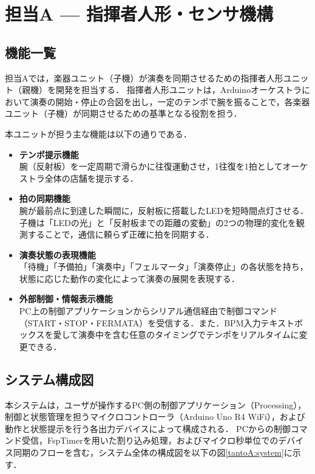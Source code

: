 \section{担当A — 指揮者人形・センサ機構}

\subsection{機能一覧}
担当Aでは，楽器ユニット（子機）が演奏を同期させるための指揮者人形ユニット（親機）を開発を担当する．
指揮者人形ユニットは，Arduinoオーケストラにおいて演奏の開始・停止の合図を出し，一定のテンポで腕を振ることで，各楽器ユニット（子機）が同期させるための基準となる役割を担う．\par
本ユニットが担う主な機能は以下の通りである．

\begin{itemize}
    \item \textbf{テンポ提示機能}\\
    腕（反射板）を一定周期で滑らかに往復運動させ，1往復を1拍としてオーケストラ全体の店舗を提示する．

    \item \textbf{拍の同期機能}\\
    腕が最前点に到達した瞬間に，反射板に搭載したLEDを短時間点灯させる．子機は「LEDの光」と「反射板までの距離の変動」の2つの物理的変化を観測することで，通信に頼らず正確に拍を同期する．

    \item \textbf{演奏状態の表現機能}\\
    「待機」「予備拍」「演奏中」「フェルマータ」「演奏停止」の各状態を持ち，状態に応じた動作の変化によって演奏の展開を表現する．

    \item \textbf{外部制御・情報表示機能}\\
    PC上の制御アプリケーションからシリアル通信経由で制御コマンド（START・STOP・FERMATA）を受信する．また．BPM入力テキストボックスを愛して演奏中を含む任意のタイミングでテンポをリアルタイムに変更できる．
\end{itemize}

\subsection{システム構成図}
本システムは，ユーザが操作するPC側の制御アプリケーション（Processing），制御と状態管理を担うマイクロコントローラ（Arduino Uno R4 WiFi），および動作と状態提示を行う各出力デバイスによって構成される．
PCからの制御コマンド受信，FspTimerを用いた割り込み処理，およびマイクロ秒単位でのデバイス同期のフローを含む，システム全体の構成図を以下の図\ref{tantoA:system}に示す．

